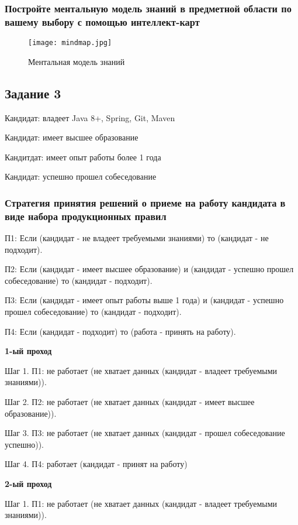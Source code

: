 \documentclass[14pt,a4paper,report]{report}
\begin{document}
\subsubsection{Постройте ментальную модель знаний в предметной области по вашему выбору с помощью интеллект-карт}

\begin{figure}[h!]
\centering
\texttt{[image: mindmap.jpg]}
\caption{Ментальная модель знаний}
\label{image:1}
\end{figure}

\subsection{Задание 3}
Кандидат: владеет Java 8+, Spring, Git, Maven

Кандидат: имеет высшее образование

Кандитдат: имеет опыт работы более 1 года

Кандидат: успешно прошел собеседование

\subsubsection{Стратегия принятия решений о приеме на работу кандидата в виде набора продукционных правил}


П1: Если (кандидат - не владеет требуемыми знаниями) то (кандидат - не подходит).

П2: Если (кандидат - имеет высшее образование) и (кандидат - успешно прошел собеседование) то (кандидат - подходит).

П3: Если (кандидат - имеет опыт работы выше 1 года) и (кандидат - успешно прошел собеседование) то (кандидат - подходит).

П4: Если (кандидат - подходит) то (работа - принять на работу).

\textbf{1-ый проход}

Шаг 1. П1: не работает (не хватает данных (кандидат - владеет требуемыми знаниями)).

Шаг 2. П2: не работает (не хватает данных (кандидат - имеет высшее образование)).

Шаг 3. П3: не работает (не хватает данных (кандидат - прошел собеседование успешно)).

Шаг 4. П4:  работает (кандидат - принят на работу)

\textbf{2-ый проход}

Шаг 1. П1: не работает (не хватает данных (кандидат - владеет требуемыми знаниями)).
\end{document}
